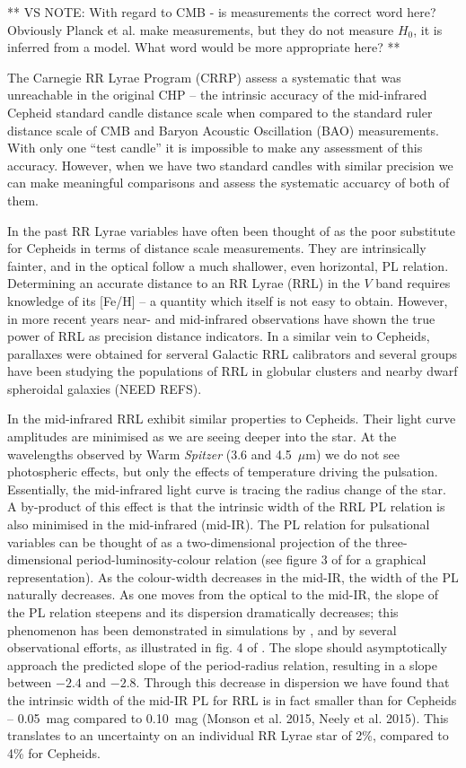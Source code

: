 \documentclass[a4paper,fleqn,usenatbib]{mnras}
\begin{document}
** VS NOTE: With regard to CMB - is measurements the correct word here? Obviously Planck et al. make measurements, but they do not measure $H_{0}$, it is inferred from a model. What word would be more appropriate here? **

The Carnegie RR Lyrae Program (CRRP) assess a systematic that was unreachable in the original CHP -- the intrinsic accuracy of the mid-infrared Cepheid standard candle distance scale when compared to the standard ruler distance scale of CMB and Baryon Acoustic Oscillation (BAO) measurements. With only one ``test candle'' it is impossible to make any assessment of this accuracy. However, when we have two standard candles with similar precision we can make meaningful comparisons and assess the systematic accuarcy of both of them.

In the past RR Lyrae variables have often been thought of as the poor substitute for Cepheids in terms of distance scale measurements. They are intrinsically fainter, and in the optical follow a much shallower, even horizontal, PL relation. Determining an accurate distance to an RR Lyrae (RRL) in the $V$ band requires knowledge of its [Fe/H] -- a quantity which itself is not  easy to obtain. However, in more recent years near- and mid-infrared observations have shown the true power of RRL as precision distance indicators. In a similar vein to Cepheids,  parallaxes were obtained for serveral Galactic RRL calibrators \citet{2011AJ....142..187B} and several groups have been studying the populations of RRL in globular clusters and nearby dwarf spheroidal galaxies (NEED REFS). 

In the mid-infrared RRL exhibit similar properties to Cepheids\citep{2013ApJ...776..135M}. Their light curve amplitudes are minimised as we are seeing deeper into the star. At the wavelengths observed by Warm \textit{Spitzer} (3.6 and 4.5~$\mu$m) we do not see photospheric effects, but only the effects of temperature driving the pulsation. Essentially, the mid-infrared light curve is tracing the radius change of the star. A by-product of this effect is that the intrinsic width of the RRL PL relation is also minimised in the mid-infrared (mid-IR). The PL relation for pulsational variables can be thought of as a two-dimensional projection of the three-dimensional period-luminosity-colour relation (see figure 3 of \citet{1991PASP..103..933M} for a graphical representation). As the colour-width decreases in the mid-IR, the width of the PL naturally decreases. As one moves from the optical to the mid-IR, the slope of the PL relation steepens and its dispersion dramatically decreases; this phenomenon has been demonstrated in simulations by \citet{2004ApJS..154..633C}, and by several observational efforts, as illustrated in fig. 4 of \citet{2013ApJ...776..135M}. The slope should asymptotically approach the predicted slope of the period-radius relation, resulting in a slope between $-2.4$ and $-2.8$. Through this decrease in dispersion we have found that the intrinsic width of the mid-IR PL for RRL is in fact smaller than for Cepheids -- 0.05~mag compared to 0.10~mag (Monson et al. 2015, Neely et al. 2015). This translates to an uncertainty on an individual RR Lyrae star of 2\%, compared to 4\% for Cepheids. 
\end{document}
